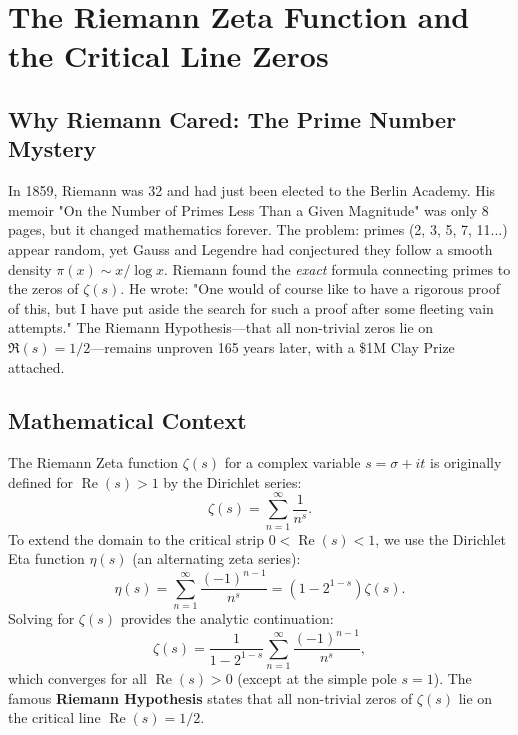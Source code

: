 \documentclass[11pt]{amsart}
\theoremstyle{definition}
\begin{document}
\section{The Riemann Zeta Function and the Critical Line Zeros}
\label{sec:zeta}

\subsection{Why Riemann Cared: The Prime Number Mystery}
In 1859, Riemann was 32 and had just been elected to the Berlin Academy. His memoir "On the Number of Primes Less Than a Given Magnitude" was only 8 pages, but it changed mathematics forever. The problem: primes (2, 3, 5, 7, 11...) appear random, yet Gauss and Legendre had conjectured they follow a smooth density $\pi(x) \sim x/\log x$. Riemann found the \textit{exact} formula connecting primes to the zeros of $\zeta(s)$. He wrote: "One would of course like to have a rigorous proof of this, but I have put aside the search for such a proof after some fleeting vain attempts." The Riemann Hypothesis---that all non-trivial zeros lie on $\Re(s)=1/2$---remains unproven 165 years later, with a \$1M Clay Prize attached.

\subsection{Mathematical Context}
The Riemann Zeta function $\zeta(s)$ for a complex variable $s = \sigma + it$ is originally defined for $\operatorname{Re}(s) > 1$ by the Dirichlet series:
\begin{equation}
\label{eq:zeta_def}
\zeta(s) = \sum_{n=1}^{\infty} \frac{1}{n^s}.
\end{equation}
To extend the domain to the critical strip $0 < \operatorname{Re}(s) < 1$, we use the Dirichlet Eta function $\eta(s)$ (an alternating zeta series):
\begin{equation}
\label{eq:eta_def}
\eta(s) = \sum_{n=1}^{\infty} \frac{(-1)^{n-1}}{n^s} = (1 - 2^{1-s})\zeta(s).
\end{equation}
Solving for $\zeta(s)$ provides the analytic continuation:
\begin{equation}
\label{eq:zeta_cont}
\zeta(s) = \frac{1}{1 - 2^{1-s}} \sum_{n=1}^{\infty} \frac{(-1)^{n-1}}{n^s},
\end{equation}
which converges for all $\operatorname{Re}(s) > 0$ (except at the simple pole $s=1$). The famous \textbf{Riemann Hypothesis} states that all non-trivial zeros of $\zeta(s)$ lie on the critical line $\operatorname{Re}(s) = 1/2$.
\end{document}

